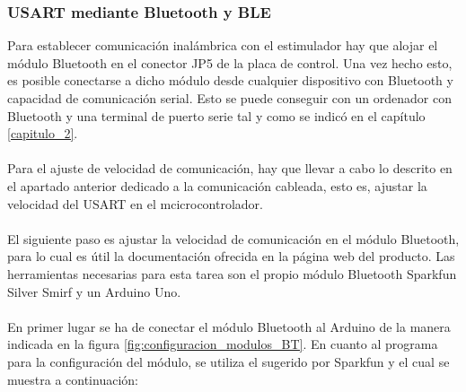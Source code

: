 \subsubsection{USART mediante Bluetooth y BLE}
Para establecer comunicación inalámbrica con el estimulador hay que alojar el módulo Bluetooth en el conector JP5 de la placa de control. Una vez hecho esto, es posible conectarse a dicho módulo desde cualquier dispositivo con Bluetooth y capacidad de comunicación serial. Esto se puede conseguir con un ordenador con Bluetooth y una terminal de puerto serie tal y como se indicó en el capítulo \ref{capitulo_2}.
\\
\\
Para el ajuste de velocidad de comunicación, hay que llevar a cabo lo descrito en el apartado anterior dedicado a la comunicación cableada, esto es, ajustar la velocidad del USART en el mcicrocontrolador.
\\
\\
El siguiente paso es ajustar la velocidad de comunicación en el módulo Bluetooth, para lo cual es útil la documentación ofrecida en la página web del producto. Las herramientas necesarias para esta tarea son el propio módulo Bluetooth Sparkfun Silver Smirf y un Arduino Uno.
\\
\\
En primer lugar se ha de conectar el módulo Bluetooth al Arduino de la manera indicada en la figura \ref{fig:configuracion_modulos_BT}. En cuanto al programa para la configuración del módulo, se utiliza el sugerido por Sparkfun y el cual se muestra a continuación:


